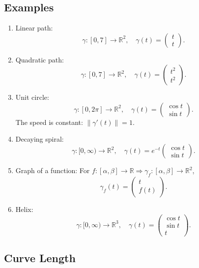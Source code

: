 \documentclass{article}
\begin{document}
    \subsection{Examples}
    \begin{enumerate}
        \item Linear path:  
        \[ \gamma : [0, 7] \to \mathbb{R}^2, \quad \gamma(t) = \begin{pmatrix} t \\ t \end{pmatrix}. \]  
        
        \item Quadratic path:  
        \[ \gamma : [0, 7] \to \mathbb{R}^2, \quad \gamma(t) = \begin{pmatrix} t^2 \\ t^2 \end{pmatrix}. \]  
        
        \item Unit circle:  
        \[ \gamma : [0, 2\pi] \to \mathbb{R}^2, \quad \gamma(t) = \begin{pmatrix} \cos t \\ \sin t \end{pmatrix}. \]  
        The speed is constant: \( \|\gamma'(t)\| = 1 \).  
        
        \item Decaying spiral:  
        \[ \gamma : [0, \infty) \to \mathbb{R}^2, \quad \gamma(t) = e^{-t} \begin{pmatrix} \cos t \\ \sin t \end{pmatrix}. \]  
        
        \item Graph of a function:  
        For \( f : [\alpha, \beta] \to \mathbb{R} \Rightarrow \gamma_f : [\alpha,\beta] \rightarrow \mathbb{R}^{2}\),  
        \[ \gamma_f(t) = \begin{pmatrix} t \\ f(t) \end{pmatrix}. \]  
        
        \item Helix:  
        \[ \gamma : [0, \infty) \to \mathbb{R}^3, \quad \gamma(t) = \begin{pmatrix} \cos t \\ \sin t \\ t \end{pmatrix}. \]  
    \end{enumerate}
\subsection{Curve Length}
\end{document}
